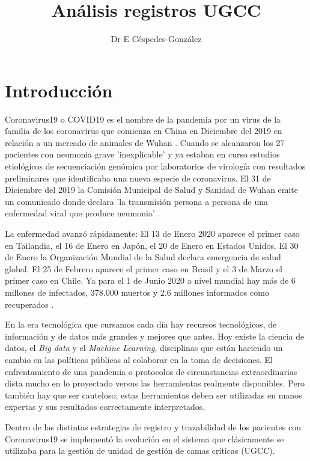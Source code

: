 \documentclass{article}
\title{Análisis registros UGCC}
\author{Dr E Céspedes-González}
\date{\fechafinal}
\begin{document}
\maketitle

\tableofcontents

\newpage

\section{Introducción}

Coronavirus19 o COVID19 es el nombre de la pandemia por un virus de la familia de los coronavirus que comienza en China en Diciembre del 2019 en relación a un mercado de animales de Wuhan \cite{wang_novel_2020}. Cuando se alcanzaron los 27 pacientes con neumonia grave 'inexplicable' y ya estaban en curso estudios etiológicos de secuenciación genómica por laboratorios de virología con resultados preliminares que identificaba una nueva especie de coronavirus. El 31 de Diciembre del 2019 la Comisión Municipal de Salud y Sanidad de Wuhan emite un comunicado donde declara 'la transmisión persona a persona de una enfermedad viral que produce neumonia' \cite{oms_oms_2020}.

La enfermedad avanzó rápidamente:  El 13 de Enero 2020 aparece el primer caso en Tailandia, el 16 de Enero en Japón, el 20 de Enero en Estados Unidos. El 30 de Enero la Organización Mundial de la Salud declara emergencia de salud global. El 25 de Febrero aparece el primer caso en Brasil y el 3 de Marzo el primer caso en Chile. Ya para el 1 de Junio 2020 a nivel mundial hay más de 6 millones de infectados, 378.000 muertos y 2.6 millones informados como recuperados \cite{oms_covid-19_2020}.

En la era tecnológica que cursamos cada día hay recursos tecnológicos, de información y de datos más grandes y mejores que antes. Hoy existe la ciencia de datos, el \textit{Big data} y el \textit{Machine Learning}, disciplinas que están haciendo un cambio en las políticas públicas al colaborar en la toma de decisiones. El enfrentamiento de una pandemia o protocolos de circunstancias extraordinarias dista mucho en lo proyectado versus las herramientas realmente disponibles. Pero también hay que ser cauteloso; estas herramientas deben ser utilizadas en manos expertas y sus resultados correctamente interpretados.

Dentro de las distintas estrategias de registro y trazabilidad de los pacientes con Coronavirus19 se implementó la evolución en el sistema que clásicamente se utilizaba para la gestión de unidad de gestión de camas críticas (UGCC).
\end{document}

